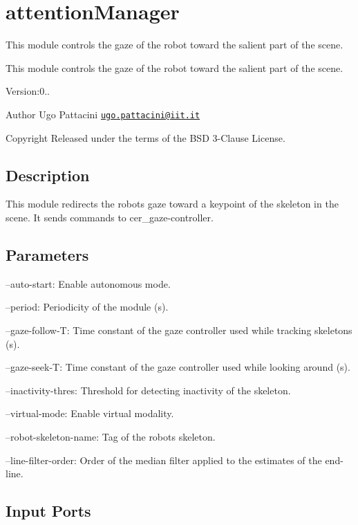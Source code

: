 \section{attention\+Manager}
\label{group__attentionManager}


This module controls the gaze of the robot toward the salient part of the scene.  


This module controls the gaze of the robot toward the salient part of the scene. 

Version\+:0.. \begin{DoxyAuthor}{Author}
Ugo Pattacini \href{mailto:ugo.pattacini@iit.it}{\tt ugo.\+pattacini@iit.\+it} ~\newline
 
\end{DoxyAuthor}
\begin{DoxyCopyright}{Copyright}
Released under the terms of the B\+SD 3-\/\+Clause License. 
\end{DoxyCopyright}
\hypertarget{group__skeletonViewer_intro_sec}{}\subsection{Description}\label{group__skeletonViewer_intro_sec}
This module redirects the robot\textquotesingle{}s gaze toward a keypoint of the skeleton in the scene. It sends commands to cer\+\_\+gaze-\/controller.\hypertarget{group__skeletonViewer_parameters_sec}{}\subsection{Parameters}\label{group__skeletonViewer_parameters_sec}

\begin{DoxyItemize}
\item --auto-\/start\+: Enable autonomous mode.
\item --period\+: Periodicity of the module (s).
\item --gaze-\/follow-\/T\+: Time constant of the gaze controller used while tracking skeletons (s).
\item --gaze-\/seek-\/T\+: Time constant of the gaze controller used while looking around (s).
\item --inactivity-\/thres\+: Threshold for detecting inactivity of the skeleton.
\item --virtual-\/mode\+: Enable virtual modality.
\item --robot-\/skeleton-\/name\+: Tag of the robot\textquotesingle{}s skeleton.
\item --line-\/filter-\/order\+: Order of the median filter applied to the estimates of the end-\/line. 
\end{DoxyItemize}\hypertarget{group__skeletonViewer_inputports_sec}{}\subsection{Input Ports}\label{group__skeletonViewer_inputports_sec}

